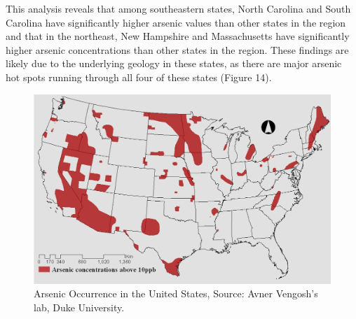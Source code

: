 \documentclass[12pt,]{article}
\begin{document}
This analysis reveals that among southeastern states, North Carolina and
South Carolina have significantly higher arsenic values than other
states in the region and that in the northeast, New Hampshire and
Massachusetts have significantly higher arsenic concentrations than
other states in the region. These findings are likely due to the
underlying geology in these states, as there are major arsenic hot spots
running through all four of these states (Figure 14).

\begin{figure}
\centering
\includegraphics{../Data/Processed/ArsenicFigure.png}
\caption{Arsenic Occurrence in the United States, Source: Avner
Vengosh's lab, Duke University.}
\end{figure}
\end{document}
